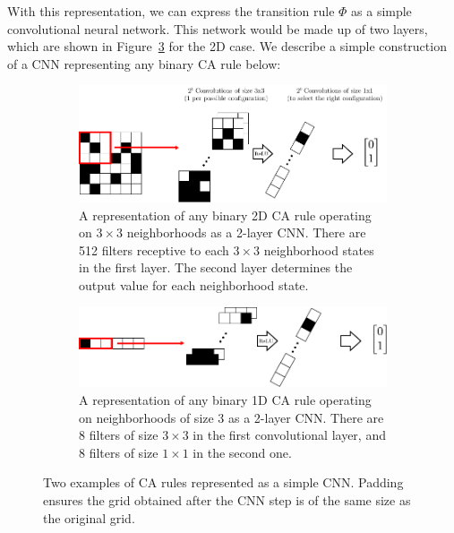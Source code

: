 With this representation, we can express the transition rule $\Phi$ as a simple
convolutional neural network. This network would be made up of two layers, which
are shown in Figure~\ref{fig:ca_cnn_2dims} for the 2D case. We describe a simple construction of a \ac{CNN} representing any binary \ac{CA} rule below:

\begin{figure}[htbp]
  \centering
  \begin{subfigure}[b]{\linewidth}
    \centering
  \includegraphics[width=.9\linewidth]{figures/global_schema}
  \caption{\label{fig:global_schema}A representation of any binary 2D CA rule
    operating on $3\times 3$ neighborhoods as a 2-layer \ac{CNN}. There are 512 filters
    receptive to each $3\times 3$ neighborhood states in the first layer. The second
    layer determines the output value for each neighborhood state.}
  \end{subfigure}
  \vspace{20pt}
  \begin{subfigure}[b]{\linewidth}
    \centering
  \includegraphics[width=.9\linewidth]{figures/one_d_global_schema}
  \caption{\label{fig:one_d_global_schema}A representation of any binary 1D CA
    rule operating on neighborhoods of size 3 as a 2-layer \ac{CNN}. There are 8
    filters of size $3\times 3$ in the first convolutional layer, and 8 filters of size $1\times 1$
    in the second one.}
  \end{subfigure}
  \caption{Two examples of \ac{CA} rules represented as a simple CNN. Padding
    ensures the grid obtained after the CNN step is of the same size as the
    original grid.}\label{fig:ca_cnn_2dims}
\end{figure}


